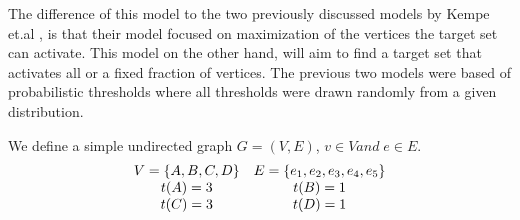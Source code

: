 The difference of this model to the two previously discussed models by Kempe et.al \cite{Kempe}\cite{Shakarian:2012:LSN:2456719.2457081}, is that their model focused on maximization of the vertices the target set can activate. This model on the other hand, will aim to find a target set that activates all or a fixed fraction of vertices. The previous two models were based of probabilistic thresholds where all thresholds were drawn randomly from a given distribution. \cite{Kempe}\cite{chen}

We define a simple undirected graph $G=(V,E)$, $v \in V and\; e \in E$. 
\begin{equation}
	\begin{array}{c c}
	V=\{A, B, C ,D\} & E=\{e_1, e_2, e_3, e_4, e_5\}\\
	t(A)=3 & t(B)=1 \\
	t(C)=3 & t(D)=1 \\
	\end{array}
\end{equation}

